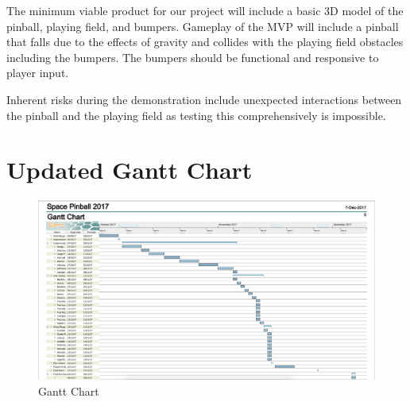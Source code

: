 \documentclass[12pt]{article}
\begin{document}
The minimum viable product for our project will include a basic 3D model of the pinball, playing field, and bumpers. Gameplay of the MVP will include a pinball that falls due to the effects of gravity and collides with the playing field obstacles including the bumpers. The bumpers should be functional and responsive to player input. 

Inherent risks during the demonstration include unexpected interactions between the pinball and the playing field as testing this comprehensively is impossible. 

\section{Updated Gantt Chart}

\begin{figure}[h]
  \includegraphics[scale=0.15]{gantt.png}
  \caption{Gantt Chart}
  \label{fig:Gantt Chart}
\end{figure}

\clearpage
\end{document}
